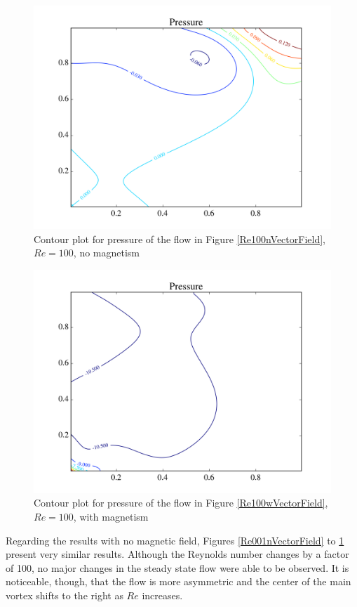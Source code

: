 \documentclass[journal]{IEEEtran}
\begin{document}
\begin{figure}[!t]
\centering
\includegraphics[width=\linewidth]{figures/Re100/n/pressure}
\caption{Contour plot for pressure of the flow in Figure \ref{Re100nVectorField}, $\mathit{Re}=100$, no magnetism\label{Re100nPressure}}
\end{figure}


\begin{figure}[!t]
\centering
\includegraphics[width=\linewidth]{figures/Re100/w/pressure}
\caption{Contour plot for pressure of the flow in Figure \ref{Re100wVectorField}, $\mathit{Re}=100$, with magnetism \label{Re100wPressure}}
\end{figure}

Regarding the results with no magnetic field, Figures \ref{Re001nVectorField} to \ref{Re100nPressure} present very similar results. Although the Reynolds number changes by a factor of 100, no major changes in the steady state flow were able to be observed. It is noticeable, though, that the flow is more asymmetric and the center of the main vortex shifts to the right as $\mathit{Re}$ increases.
\end{document}

